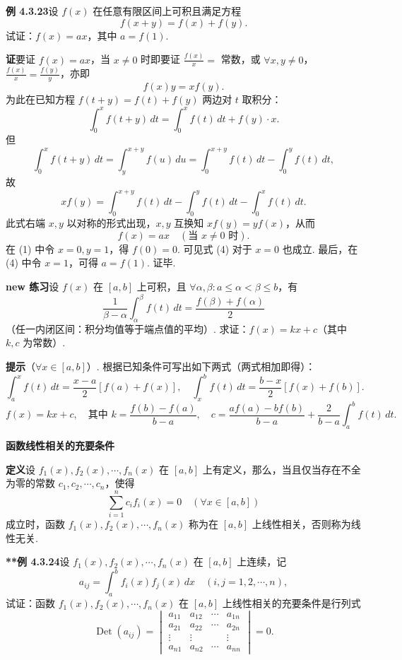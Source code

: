 \documentclass[UTF8, 12pt, fontset=fandol, oneside]{ctexart}
\begin{document}
\noindent\textbf{例 4.3.23}\quad 设 $f(x)$ 在任意有限区间上可积且满足方程
\[
f(x+y)=f(x)+f(y).
\tag{1}
\]
试证：$f(x)=ax$，其中 $a=f(1)$.

\noindent\textbf{证}\quad 要证 $f(x)=ax$，当 $x\ne0$ 时即要证 $\frac{f(x)}x=$ 常数，或 $\forall x,y\ne0$，$\frac{f(x)}x=\frac{f(y)}y$，亦即
\[
f(x)y=xf(y).
\tag{2}
\]
为此在已知方程 $f(t+y)=f(t)+f(y)$ 两边对 $t$ 取积分：
\[
\int_0^x f(t+y)\,dt
=\int_0^x f(t)\,dt+f(y)\cdot x.
\tag{3}
\]
但
\[
\int_0^x f(t+y)\,dt
=\int_y^{x+y}f(u)\,du
=\int_0^{x+y}f(t)\,dt-\int_0^y f(t)\,dt,
\]
故
\[
xf(y)=\int_0^{x+y}f(t)\,dt-\int_0^y f(t)\,dt-\int_0^x f(t)\,dt.
\]
此式右端 $x,y$ 以对称的形式出现，$x,y$ 互换知 $xf(y)=yf(x)$，从而
\[
f(x)=ax\quad(\text{当 }x\ne0\text{ 时}).
\tag{4}
\]
在 (1) 中令 $x=0,y=1$，得 $f(0)=0$. 可见式 (4) 对于 $x=0$ 也成立. 最后，在 (4) 中令 $x=1$，可得 $a=f(1)$. 证毕.

\noindent\textbf{new 练习}\quad 设 $f(x)$ 在 $[a,b]$ 上可积，且 $\forall\alpha,\beta:a\le\alpha<\beta\le b$，有
\[
\frac1{\beta-\alpha}\int_\alpha^\beta f(t)\,dt
=\frac{f(\beta)+f(\alpha)}2
\]
（任一内闭区间：积分均值等于端点值的平均）. 求证：$f(x)=kx+c$（其中 $k,c$ 为常数）.

\noindent\textbf{提示}\quad （$\forall x\in[a,b]$）. 根据已知条件可写出如下两式（两式相加即得）：
\[
\int_a^x f(t)\,dt=\frac{x-a}{2}[f(a)+f(x)],\quad
\int_x^b f(t)\,dt=\frac{b-x}{2}[f(x)+f(b)].
\]
\[
f(x)=kx+c,\quad\text{其中 }k=\frac{f(b)-f(a)}{b-a},\quad
c=\frac{af(a)-bf(b)}{b-a}+\frac{2}{b-a}\int_a^b f(t)\,dt.
\]

\noindent\textbf{函数线性相关的充要条件}

\noindent\textbf{定义}\quad 设 $f_1(x),f_2(x),\cdots,f_n(x)$ 在 $[a,b]$ 上有定义，那么，当且仅当存在不全为零的常数 $c_1,c_2,\cdots,c_n$，使得
\[
\sum_{i=1}^n c_i f_i(x)=0\quad(\forall x\in[a,b])
\]
成立时，函数 $f_1(x),f_2(x),\cdots,f_n(x)$ 称为在 $[a,b]$ 上线性相关，否则称为线性无关.

\noindent\textbf{**例 4.3.24}\quad 设 $f_1(x),f_2(x),\cdots,f_n(x)$ 在 $[a,b]$ 上连续，记
\[
a_{ij}=\int_a^b f_i(x)f_j(x)\,dx\quad(i,j=1,2,\cdots,n),
\]
试证：函数 $f_1(x),f_2(x),\cdots,f_n(x)$ 在 $[a,b]$ 上线性相关的充要条件是行列式
\[
\operatorname{Det}(a_{ij})=
\begin{vmatrix}
a_{11}&a_{12}&\cdots&a_{1n}\\
a_{21}&a_{22}&\cdots&a_{2n}\\
\vdots&\vdots&&\vdots\\
a_{n1}&a_{n2}&\cdots&a_{nn}
\end{vmatrix}=0.
\]
\end{document}
